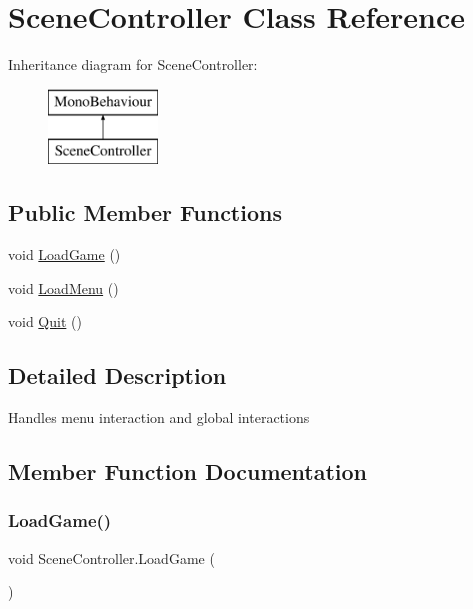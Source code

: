 \hypertarget{class_scene_controller}{}\section{Scene\+Controller Class Reference}
\label{class_scene_controller}
Inheritance diagram for Scene\+Controller\+:\begin{figure}[H]
\begin{center}
\leavevmode
\includegraphics[height=2.000000cm]{class_scene_controller}
\end{center}
\end{figure}
\subsection*{Public Member Functions}
\begin{DoxyCompactItemize}
\item 
void \hyperlink{class_scene_controller_ab4c9c8564748875f4eb983c861783716}{Load\+Game} ()
\item 
void \hyperlink{class_scene_controller_a4fb5d32427ebae6e59dc136a3a15d07c}{Load\+Menu} ()
\item 
void \hyperlink{class_scene_controller_a9b24f2313df6b1ee47e72a978fc3528d}{Quit} ()
\end{DoxyCompactItemize}


\subsection{Detailed Description}
Handles menu interaction and global interactions 

\subsection{Member Function Documentation}
\mbox{\label{class_scene_controller_ab4c9c8564748875f4eb983c861783716}} 
\subsubsection{\texorpdfstring{Load\+Game()}{LoadGame()}}
{\footnotesize\ttfamily void Scene\+Controller.\+Load\+Game (\begin{DoxyParamCaption}{ }\end{DoxyParamCaption})}


